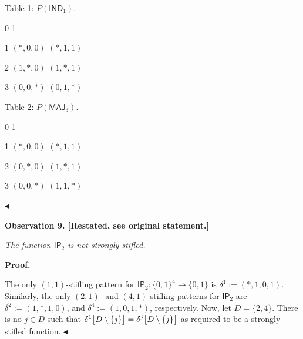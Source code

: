 Table 1: $P(\mathsf{IND}_{1})$.




0
1




1
$(*,0,0)$
$(*,1,1)$


2
$(1,*,0)$
$(1,*,1)$


3
$(0,0,*)$
$(0,1,*)$







Table 2: $P(\mathsf{MAJ}_{3})$.




0
1




1
$(*,0,0)$
$(*,1,1)$


2
$(0,*,0)$
$(1,*,1)$


3
$(0,0,*)$
$(1,1,*)$









$\blacktriangleleft$\par






\par\medskip\noindent\textbf{
\textbf{Observation 9}\textbf{.}
[Restated, see original statement.]}\par



\emph{The function $\mathsf{IP}_{2}$ is not strongly stifled.}\par








\par\medskip\noindent\textbf{Proof.}\par




The only $(1,1)$-stifling pattern for $\mathsf{IP}_{2}:\{0,1\}^{4}\to\{0,1\}$ is $\delta^{1}:=(*,1,0,1)$.
Similarly, the only $(2,1)$- and $(4,1)$-stifling patterns for $\mathsf{IP}_{2}$ are $\delta^{2}:=(1,*,1,0)$, and $\delta^{4}:=(1,0,1,*)$, respectively.
Now, let $D=\{2,4\}$.
There is no $j\in D$ such that $\delta^{1}\bigl{[}D\setminus\{j\}\bigr{]}=\delta^{j}\bigl{[}D\setminus\{j\}%
\bigr{]}$ as required to be a strongly stifled function.
$\blacktriangleleft$\par




\par



